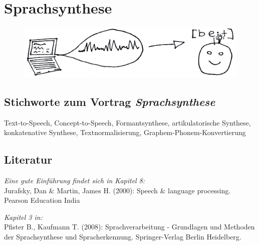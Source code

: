 \chapter{Sprachsynthese}


\begin{figure}[htbp]
\begin{center}
\includegraphics[width=\textwidth]{grafiken/sprachsynthese/synthese.jpg}
\label{ts}
\end{center}
\end{figure}

\section{Stichworte zum Vortrag \em{Sprachsynthese}}

Text-to-Speech, Concept-to-Speech, Formantsynthese, artikulatorische Synthese, konkatenative Synthese, Textnormalisierung, Graphem-Phonem-Konvertierung



\section{Literatur}


\emph{Eine gute Einführung findet sich in Kapitel 8:}\\
Jurafsky, Dan \& Martin, James H. (2000): Speech \& language processing. Pearson Education India

\emph{Kapitel 3 in:}\\
Pfister B., Kaufmann T. (2008): Sprachverarbeitung - Grundlagen und 
	Methoden der Sprachsynthese und Spracherkennung. 
	Springer-Verlag Berlin Heidelberg.


\renewcommand\refname{\vskip -1cm}
{}


